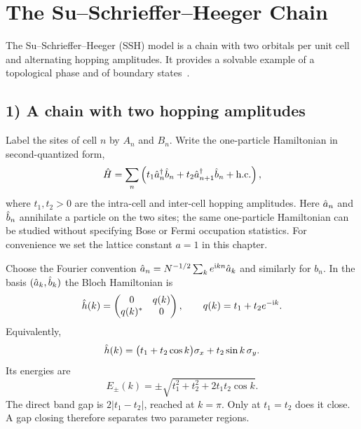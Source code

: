 \section{The Su--Schrieffer--Heeger Chain}
The Su--Schrieffer--Heeger (SSH) model is a chain with two orbitals per unit cell and alternating hopping amplitudes. It provides a solvable example of a topological phase and of boundary states~\cite{Asboth2016}.

\subsection*{1) A chain with two hopping amplitudes}
Label the sites of cell $n$ by $A_n$ and $B_n$. Write the one-particle Hamiltonian in second-quantized form,
\begin{equation}\label{eq:ssh-real}
 \hat{H}=\sum_n\left(t_1\hat{a}_n^\dagger\hat{b}_n+
               t_2\hat{a}_{n+1}^\dagger\hat{b}_n+\mathrm{h.c.}\right),
\end{equation}
where $t_1,t_2>0$ are the intra-cell and inter-cell hopping amplitudes. Here $\hat{a}_n$ and $\hat{b}_n$ annihilate a particle on the two sites; the same one-particle Hamiltonian can be studied without specifying Bose or Fermi occupation statistics. For convenience we set the lattice constant $a=1$ in this chapter.

\begin{center}
\end{center}
Choose the Fourier convention $\hat{a}_n=N^{-1/2}\sum_k e^{\mathrm{i} kn}\hat{a}_k$ and similarly for $b_n$. In the basis $(\hat{a}_k,\hat{b}_k)$ the Bloch Hamiltonian is
\begin{equation}\label{eq:ssh-bloch}
\hat{h}(k)=\begin{pmatrix}0&q(k)\\q(k)^*&0\end{pmatrix},\qquad
 q(k)=t_1+t_2e^{-\mathrm{i} k}.
\end{equation}
Equivalently,
\begin{equation}
\hat{h}(k)=\bigl(t_1+t_2\cos k\bigr)\sigma_x+t_2\sin k\,\sigma_y.
\end{equation}
Its energies are
\begin{equation}
\boxed{E_\pm(k)=\pm\sqrt{t_1^2+t_2^2+2t_1t_2\cos k}.}
\end{equation}
The direct band gap is $2|t_1-t_2|$, reached at $k=\pi$. Only at $t_1=t_2$ does it close. A gap closing therefore separates two parameter regions.


